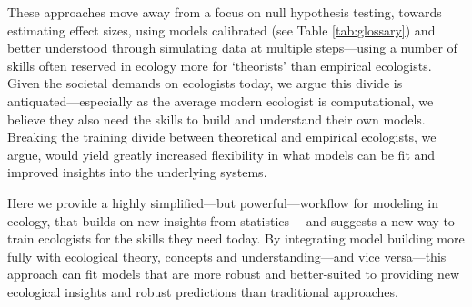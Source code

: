 \documentclass[11pt]{article}
\begin{document}
These approaches move away from a focus on null hypothesis testing, towards estimating effect sizes, using models calibrated (see Table \ref{tab:glossary}) and better understood through simulating data at multiple steps---using a number of skills often reserved in ecology more for `theorists' than empirical ecologists. Given the societal demands on ecologists today, we argue this divide is antiquated---especially as the average modern ecologist is computational, we believe they also need the skills to build and understand their own models. Breaking the training divide between theoretical and empirical ecologists, we argue, would yield greatly increased flexibility in what models can be fit and improved insights into the underlying systems.

Here we provide a highly simplified---but powerful---workflow for modeling in ecology, that builds on new insights from statistics  \citep{betanworkflow,vandeschoot2021}---and suggests a new way to train ecologists for the skills they need today. By integrating model building more fully with ecological theory, concepts and understanding---and vice versa---this approach can fit models that are more robust and better-suited to providing new ecological insights and robust predictions than traditional approaches. 
\end{document}
